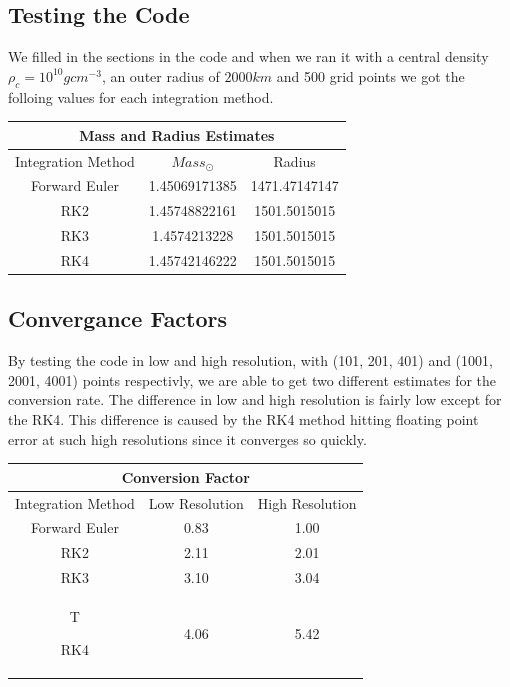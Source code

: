 \documentclass[11pt,letterpaper]{article}
\begin{document}
\subsection{Testing the Code}

We filled in the sections in the code and when we ran it with a central density
$\rho_c = 10^{10} g cm^{-3}$, an outer radius of $2000 km$ and 500 grid points
we got the folloing values for each integration method. 

\begin{center}
\begin{tabular}{|c|c|c|}
\hline
\multicolumn{3}{|c|}{Mass and Radius Estimates}\\
\hline
Integration Method & $Mass_\odot$ & Radius \\
Forward Euler & 1.45069171385 & 1471.47147147\\
RK2 & 1.45748822161 & 1501.5015015 \\
RK3 & 1.4574213228 & 1501.5015015 \\
RK4 & 1.45742146222 & 1501.5015015 \\
\hline
\end{tabular}
\end{center}

\subsection{Convergance Factors}

By testing the code in low and high resolution, with (101, 201, 401) and (1001,
2001, 4001) points respectivly, we are able to get two different estimates for
 the conversion rate. The difference in low and high resolution is fairly low
except for the RK4. This difference is caused by the RK4 method hitting floating
point error at such high resolutions since it converges so quickly.

\begin{center}
\begin{tabular}{|c|c|c|}

\hline
\multicolumn{3}{|c|}{Conversion Factor}\\
\hline
Integration Method & Low Resolution & High Resolution \\
Forward Euler & 0.83 & 1.00 \\
RK2 & 2.11 & 2.01 \\
RK3 & 3.10 & 3.04 \\T

RK4 & 4.06 & 5.42 \\
\hline
\end{tabular}
\end{center}
\end{document}
